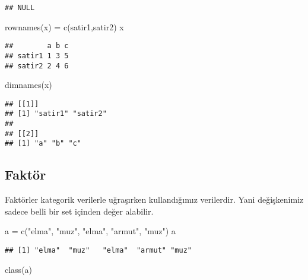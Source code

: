 \documentclass[
]{book}
\newenvironment{Shaded}{\begin{snugshade}}{\end{snugshade}}
\newcommand{\FunctionTok}[1]{\textcolor[rgb]{0.00,0.00,0.00}{#1}}
\newcommand{\NormalTok}[1]{#1}
\newcommand{\OtherTok}[1]{\textcolor[rgb]{0.56,0.35,0.01}{#1}}
\newcommand{\StringTok}[1]{\textcolor[rgb]{0.31,0.60,0.02}{#1}}
\begin{document}
\begin{verbatim}
## NULL
\end{verbatim}

\begin{Shaded}
\begin{Highlighting}[]
\FunctionTok{rownames}\NormalTok{(x) }\OtherTok{=} \FunctionTok{c}\NormalTok{(}\StringTok{\textquotesingle{}satir1\textquotesingle{}}\NormalTok{,}\StringTok{\textquotesingle{}satir2\textquotesingle{}}\NormalTok{)}
\NormalTok{x}
\end{Highlighting}
\end{Shaded}

\begin{verbatim}
##        a b c
## satir1 1 3 5
## satir2 2 4 6
\end{verbatim}

\begin{Shaded}
\begin{Highlighting}[]
\FunctionTok{dimnames}\NormalTok{(x)}
\end{Highlighting}
\end{Shaded}

\begin{verbatim}
## [[1]]
## [1] "satir1" "satir2"
## 
## [[2]]
## [1] "a" "b" "c"
\end{verbatim}

\hypertarget{faktuxf6r}{%
\subsection{Faktör}\label{faktuxf6r}}

Faktörler kategorik verilerle uğraşırken kullandığımız verilerdir. Yani değişkenimiz sadece belli bir set içinden değer alabilir.

\begin{Shaded}
\begin{Highlighting}[]
\NormalTok{a }\OtherTok{=}  \FunctionTok{c}\NormalTok{(}\StringTok{"elma"}\NormalTok{, }\StringTok{"muz"}\NormalTok{, }\StringTok{"elma"}\NormalTok{, }\StringTok{"armut"}\NormalTok{, }\StringTok{"muz"}\NormalTok{)}
\NormalTok{a}
\end{Highlighting}
\end{Shaded}

\begin{verbatim}
## [1] "elma"  "muz"   "elma"  "armut" "muz"
\end{verbatim}

\begin{Shaded}
\begin{Highlighting}[]
\FunctionTok{class}\NormalTok{(a)}
\end{Highlighting}
\end{Shaded}
\end{document}
